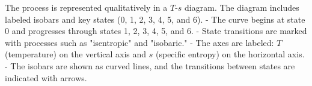The process is represented qualitatively in a \( T \)-\( s \) diagram. The diagram includes labeled isobars and key states (0, 1, 2, 3, 4, 5, and 6).  
- The curve begins at state 0 and progresses through states 1, 2, 3, 4, 5, and 6.  
- State transitions are marked with processes such as "isentropic" and "isobaric."  
- The axes are labeled: \( T \) (temperature) on the vertical axis and \( s \) (specific entropy) on the horizontal axis.  
- The isobars are shown as curved lines, and the transitions between states are indicated with arrows.